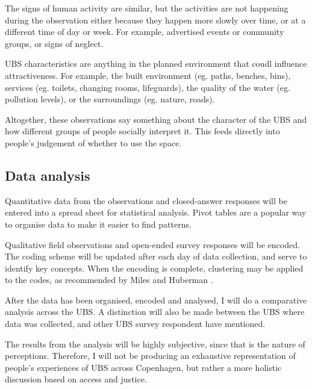 \documentclass{article}
\begin{document}
The signs of human activity are similar, but the activities are not happening during the observation either because they happen more slowly over time, or at a different time of day or week. For example, advertised events or community groups, or signs of neglect.

UBS characteristics are anything in the planned environment that coudl influence attractiveness.
For example, the built environment (eg. paths, benches, bins), services (eg. toilets, changing rooms, lifeguards), the quality of the water (eg. pollution levels), or the surroundings (eg. nature, roads).

Altogether, these observations say something about the character of the UBS and how different groups of people socially interpret it. This feeds directly into people's judgement of whether to use the space.

\subsection{Data analysis}

Quantitative data from the observations and closed-answer responses will be entered into a spread sheet for statistical analysis. Pivot tables are a popular way to organise data to make it easier to find patterns.

Qualitative field observations and open-ended survey responses will be encoded. The coding scheme will be updated after each day of data collection, and serve to identify key concepts. When the encoding is complete, clustering may be applied to the codes, as recommended by Miles and Huberman \parencite{miles1994qualitative}.

After the data has been organised, encoded and analysed, I will do a comparative analysis across the UBS. A distinction will also be made between the UBS where data was collected, and other UBS  survey respondent have mentioned. 


The results from the analysis will be highly subjective, since that is the nature of perceptions. Therefore, I will not be producing an exhaustive representation of people's experiences of UBS across Copenhagen, but rather a more holistic discussion based on access and justice.
\end{document}
